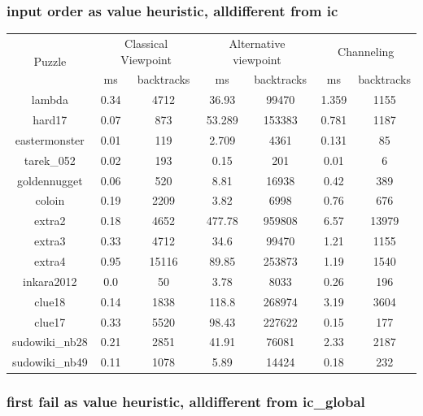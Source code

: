 \documentclass{report}
\begin{document}
\subsubsection{input order as value heuristic, alldifferent from ic}
\begin{table}[h!]
  \begin{tabular}{|c|c|c|c|c|c|c|}
    \hline
    \multirow{2}{*}{Puzzle} &
    \multicolumn{2}{L|}{Classical Viewpoint} &
    \multicolumn{2}{L|}{Alternative viewpoint} &
    \multicolumn{2}{L|}{Channeling} \\
    & ms & backtracks & ms & backtracks & ms & backtracks \\
    \hline
        lambda & 0.34 & 4712 & 36.93 & 99470 & 1.359 & 1155\\
        hard17 & 0.07 & 873 & 53.289 & 153383 & 0.781 & 1187\\
        eastermonster & 0.01 & 119 & 2.709 & 4361 & 0.131 & 85\\
        tarek\_052 & 0.02 & 193 & 0.15 & 201 & 0.01 & 6\\
        goldennugget & 0.06 & 520 & 8.81 & 16938 & 0.42 & 389\\
        coloin & 0.19 & 2209 & 3.82 & 6998 & 0.76 & 676\\
        extra2 & 0.18 & 4652 & 477.78 & 959808 & 6.57 & 13979\\
        extra3 & 0.33 & 4712 & 34.6 & 99470 & 1.21 & 1155\\
        extra4 & 0.95 & 15116 & 89.85 & 253873 & 1.19 & 1540\\
        inkara2012 & 0.0 & 50 & 3.78 & 8033 & 0.26 & 196\\
        clue18 & 0.14 & 1838 & 118.8 & 268974 & 3.19 & 3604\\
        clue17 & 0.33 & 5520 & 98.43 & 227622 & 0.15 & 177\\
        sudowiki\_nb28 & 0.21 & 2851 & 41.91 & 76081 & 2.33 & 2187\\
        sudowiki\_nb49 & 0.11 & 1078 & 5.89 & 14424 & 0.18 & 232\\
    \hline
  \end{tabular}
\end{table}

\newpage
\subsubsection{first fail as value heuristic, alldifferent from ic\_global}
\end{document}
